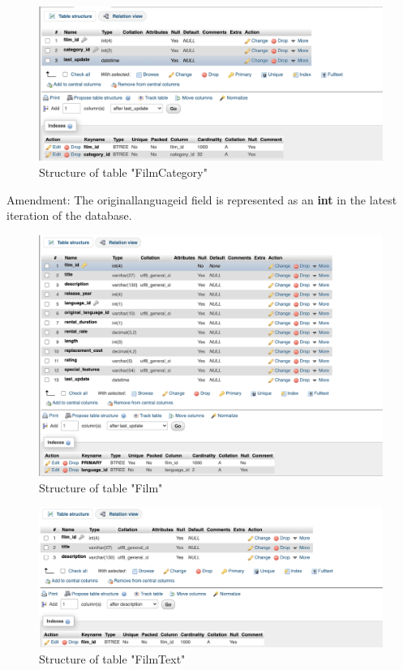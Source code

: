 \documentclass[openany]{article}
\begin{document}
	\begin{figure}[H]
		\includegraphics[width=\textwidth]{table_filmcategory_struct}
		\caption{Structure of table "Film\textunderscore Category"}	
	\end{figure}
	Amendment: The original\textunderscore language\textunderscore id field is represented as an \textbf{int} in the latest iteration of the database.
	\begin{figure}[H]
		\includegraphics[width=\textwidth]{table_film_struct}
		\caption{Structure of table "Film"}	
	\end{figure}
	\begin{figure}[H]
		\includegraphics[width=\textwidth]{table_filmtext_struct}
		\caption{Structure of table "Film\textunderscore Text"}	
	\end{figure}
\end{document}

